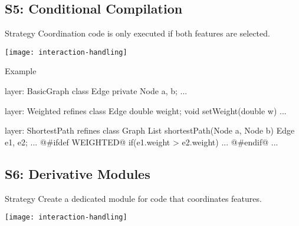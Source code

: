 \subsection{S5: Conditional Compilation}

\begin{frame}{\myframetitle}
	\begin{definition}{Strategy}
		Coordination code is only executed if both features are selected.
	\end{definition}
	\begin{notetight}{}
		\centering\texttt{[image: interaction-handling]}
	\end{notetight}
\end{frame}

\begin{frame}[fragile]{Example}
	\begin{mycolumns}[widths={50,50},animation=none]
\begin{codetight}{layer: BasicGraph}
class Edge {
	private Node a, b;
	...
}
\end{codetight}	
\begin{codetight}{layer: Weighted}
refines class Edge {
	double weight;
	void setWeight(double w){ ... }
}
\end{codetight}	
	\mynextcolumn
\begin{codetight}{layer: ShortestPath}
refines class Graph {
	List shortestPath(Node a, Node b){
		Edge e1, e2;
		...
@#ifdef WEIGHTED@		
		if(e1.weight > e2.weight) ...
@#endif@
		... 
	}
}
\end{codetight}	
	\end{mycolumns}
\end{frame}

\subsection{S6: Derivative Modules}

\begin{frame}{\myframetitle}
	\begin{definition}{Strategy}
		Create a dedicated module for code that coordinates features.
	\end{definition}
	\begin{notetight}{}
		\centering\texttt{[image: interaction-handling]}
	\end{notetight}
\end{frame}

